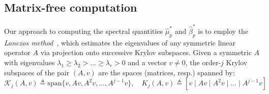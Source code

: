 \documentclass[10pt]{article}
\numberwithin{equation}{section}
\newcommand{\+}{%
	\raisebox{0.18ex}{\scaleobj{0.55}{+}}
}
\theoremstyle{definition}
\theoremstyle{definition}
\begin{document}
\subsection*{Matrix-free computation}\label{sec:lanczos_it}
Our approach to computing the spectral quantities $\hat{\mu}_p^\ast$ and $\hat{\beta}_p^\ast$ is to employ the \emph{Lanczos method}~\cite{lanczos1950iteration}, which estimates the eigenvalues of any symmetric linear operator $A$ via projection onto successive Krylov subspaces. 
Given a symmetric $A$ with eigenvalues $\lambda_1 \geq \lambda_2 > \dots \geq \lambda_r > 0$ and a vector $v \neq 0$, the order-$j$ Krylov subspaces of the pair $(A, v)$ are the spaces (matrices, resp.) spanned by: 
\begin{equation}
	\mathcal{K}_j(A, v) \triangleq \mathrm{span}\{ v, Av, A^2 v, \dots, A^{j-1}v \}, \quad K_j(A, v) \triangleq [ v \mid Av \mid A^2 v \mid \dots \mid A^{j-1}v]
\end{equation}
\end{document}
